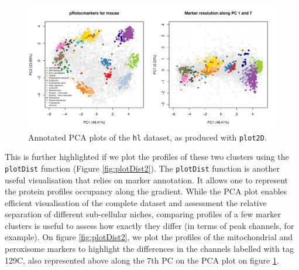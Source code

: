 \begin{figure}[!ht]
  \centering
\begin{knitrout}
\color{fgcolor}\begin{kframe}
\begin{alltt}
\hlstd{(} \hlstd{=} \hlstd{(}\hlstd{,} \hlstd{))}
  \hlstd{=} \hlstd{)}
  \hlstd{=} \hlstd{)}
  \hlstd{=} \hlstd{(}\hlstd{,} \hlstd{),}  \hlstd{=} \hlstd{)}
\end{alltt}
\end{kframe}
\includegraphics[width=\textwidth]{figure/plotmarkers-1} 

\end{knitrout}
\caption{Annotated PCA plots of the \texttt{hl} dataset, as produced
  with \texttt{plot2D}.}
  \label{fig:plotmarkers}
\end{figure}


This is further highlighted if we plot the
profiles of these two clusters using the \texttt{plotDist} function
(Figure \ref{fig:plotDist2}). The \texttt{plotDist} function is
another useful visualisation that relies on marker annotation. It
allows one to represent the protein profiles occupancy along the
gradient. While the PCA
plot enables efficient visualisation of the complete dataset and
assessment the relative separation of different sub-cellular niches,
comparing profiles of a few marker clusters is useful to assess how
exactly they differ (in terms of peak channels, for example). On
figure \ref{fig:plotDist2}, we plot the profiles of the
mitochondrial and peroxisome markers to highlight the differences
in the channels labelled with tag 129C, also represented above
along the 7th PC on the PCA plot on figure \ref{fig:plotmarkers}.


